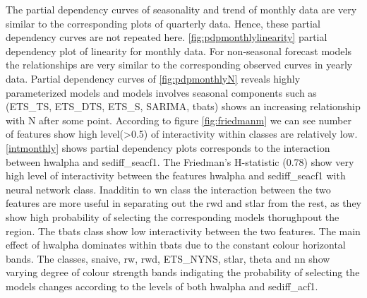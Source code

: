 \documentclass[11pt,a4paper,]{article}
\begin{document}
The partial dependency curves of seasonality and trend of monthly data are very similar to the corresponding plots of quarterly data. Hence, these partial dependency curves are not repeated here. \autoref{fig:pdpmonthlylinearity} partial dependency plot of linearity for monthly data. For non-seasonal forecast models the relationships are very similar to the corresponding observed curves in yearly data. Partial dependency curves of \autoref{fig:pdpmonthlyN} reveals highly parameterized models and models involves seasonal components such as (ETS\_TS, ETS\_DTS, ETS\_S, SARIMA, tbats) shows an increasing relationship with N after some point. According to figure \autoref{fig:friedmanm} we can see number of features show high level(\textgreater{}0.5) of interactivity within classes are relatively low. \autoref{intmonthly} shows partial dependency plots corresponds to the interaction between hwalpha and sediff\_seacf1. The Friedman's H-statistic (0.78) show very high level of interactivity between the features hwalpha and sediff\_seacf1 with neural network class. Inadditin to wn class the interaction between the two features are more useful in separating out the rwd and stlar from the rest, as they show high probability of selecting the corresponding models thorughpout the region. The tbats class show low interactivity between the two features. The main effect of hwalpha dominates within tbats due to the constant colour horizontal bands. The classes, snaive, rw, rwd, ETS\_NYNS, stlar, theta and nn show varying degree of colour strength bands indigating the probability of selecting the models changes according to the levels of both hwalpha and sediff\_acf1.
\end{document}

